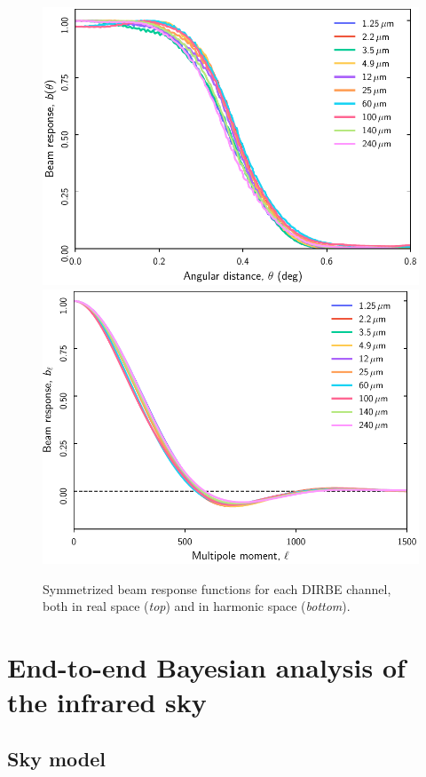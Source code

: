 \documentclass{aa}
\begin{document}
\begin{figure}
  \centering
  \includegraphics[width=\linewidth]{figs/DIRBE_beam_theta.pdf}\\
  \includegraphics[width=\linewidth]{figs/DIRBE_beam_ell.pdf}
  \caption{Symmetrized beam response functions for each DIRBE channel, both in real space (\emph{top}) and in harmonic space (\emph{bottom}).}
  \label{fig:beams}
\end{figure}

\section{End-to-end Bayesian analysis of the infrared sky}
\subsection{Sky model}
\end{document}
